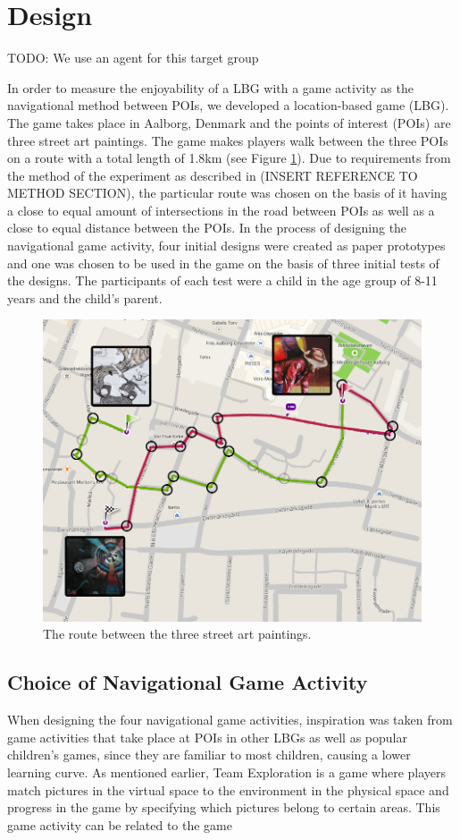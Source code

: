 \section{Design}
TODO:
We use an agent for this target group

In order to measure the enjoyability of a LBG with a game activity as the navigational method between POIs, we developed a location-based game (LBG). The game takes place in Aalborg, Denmark and the points of interest (POIs) are three street art paintings\cite{streetart}. The game makes players walk between the three POIs on a route with a total length of 1.8km (see Figure \ref{FinalRoute}). Due to requirements from the method of the experiment as described in (INSERT REFERENCE TO METHOD SECTION), the particular route was chosen on the basis of it having a close to equal amount of intersections in the road between POIs as well as a close to equal distance between the POIs. In the process of designing the navigational game activity, four initial designs were created as paper prototypes and one was chosen to be used in the game on the basis of three initial tests of the designs. The participants of each test were a child in the age group of 8-11 years and the child's parent.

\begin{figure}[hbtp]
\centering
\includegraphics[scale=0.3]{Pics/FinalRoute.png}
\caption{The route between the three street art paintings.}
\label{FinalRoute}
\end{figure}

\subsection{Choice of Navigational Game Activity}
When designing the four navigational game activities, inspiration was taken from game activities that take place at POIs in other LBGs as well as popular children's games, since they are familiar to most children, causing a lower learning curve. As mentioned earlier, Team Exploration\cite{GamingOnTheMove} is a game where players match pictures in the virtual space to the environment in the physical space and progress in the game by specifying which pictures belong to certain areas. This game activity can be related to the game 

